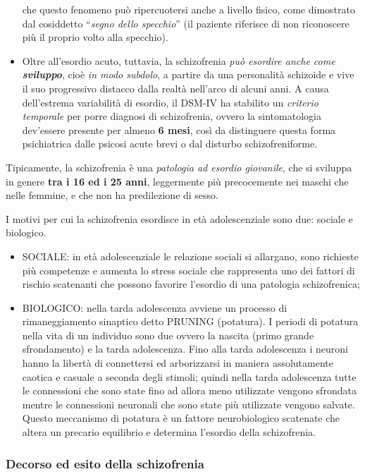 \begin{itemize}
  che questo fenomeno può ripercuotersi anche a livello fisico, come
  dimostrato dal cosiddetto ``\emph{segno dello specchio}'' (il paziente
  riferisce di non riconoscere più il proprio volto alla specchio).
\item
  Oltre all'esordio acuto, tuttavia, la schizofrenia \emph{può esordire
  anche come \textbf{sviluppo}}, cioè \emph{in modo subdolo}, a partire
  da una personalità schizoide e vive il suo progressivo distacco dalla
  realtà nell'arco di alcuni anni. A causa dell'estrema variabilità di
  esordio, il DSM-IV ha stabilito un \emph{criterio temporale} per porre
  diagnosi di schizofrenia, ovvero la sintomatologia dev'essere presente
  per almeno \textbf{6 mesi}, così da distinguere questa forma
  psichiatrica dalle psicosi acute brevi o dal disturbo
  schizofreniforme.
\end{itemize}

Tipicamente, la schizofrenia è una \emph{patologia ad esordio
giovanile}, che si sviluppa in genere \textbf{tra i 16 ed i 25 anni},
leggermente più precocemente nei maschi che nelle femmine, e che non ha
predilezione di sesso.

I motivi per cui la schizofrenia esordisce in età adolescenziale sono
due: sociale e biologico.

\begin{itemize}
\item
  SOCIALE: in età adolescenziale le relazione sociali si allargano, sono
  richieste più competenze e aumenta lo stress sociale che rappresenta
  uno dei fattori di rischio scatenanti che possono favorire l'esordio
  di una patologia schizofrenica;
\item
  BIOLOGICO: nella tarda adolescenza avviene un processo di
  rimaneggiamento sinaptico detto PRUNING (potatura). I periodi di
  potatura nella vita di un individuo sono due ovvero la nascita (primo
  grande sfrondamento) e la tarda adolescenza. Fino alla tarda
  adolescenza i neuroni hanno la libertà di connettersi ed arborizzarsi
  in maniera assolutamente caotica e casuale a seconda degli stimoli;
  quindi nella tarda adolescenza tutte le connessioni che sono state
  fino ad allora meno utilizzate vengono sfrondata mentre le connessioni
  neuronali che sono state più utilizzate vengono salvate. Questo
  meccanismo di potatura è un fattore neurobiologico scatenate che
  altera un precario equilibrio e determina l'esordio della
  schizofrenia.
\end{itemize}

\subsubsection{Decorso ed esito della schizofrenia}


